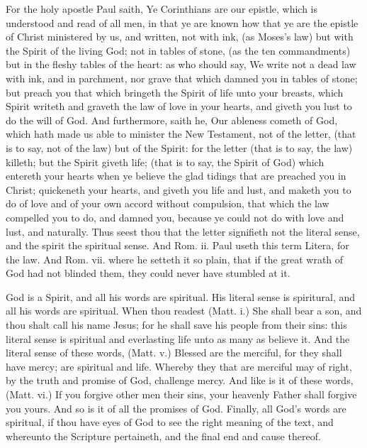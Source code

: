For the holy apostle Paul saith, Ye Corinthians are 
our epistle, which is understood and read of all men, in 
that ye are known how that ye are the epistle of Christ 
ministered by us, and written, not with ink, (as Moses's law) 
but with the Spirit of the living God; not in tables of 
stone, (as the ten commandments) but in the fleshy tables 
of the heart: as who should say, We write not a dead law 
with ink, and in parchment, nor grave that which damned 
you in tables of stone; but preach you that which bringeth 
the Spirit of life unto your breasts, which Spirit writeth 
and graveth the law of love in your hearts, and giveth you 
lust to do the will of God. And furthermore, saith he, 
Our ableness cometh of God, which hath made us able to 
minister the New Testament, not of the letter, (that is to 
say, not of the law) but of the Spirit: for the letter (that 
is to say, the law) killeth; but the Spirit giveth life; (that 
is to say, the Spirit of God) which entereth your hearts 
when ye believe the glad tidings that are preached you in 
Christ; quickeneth your hearts, and giveth you life and 
lust, and maketh you to do of love and of your own accord 
without compulsion, that which the law compelled you to 
do, and damned you, because ye could not do with love 
and lust, and naturally. Thus seest thou that the letter signifieth
not the literal sense, and the spirit the spiritual sense. 
And Rom. ii. Paul useth this term Litera, for the law. 
And Rom. vii. where he setteth it so plain, that if the 
great wrath of God had not blinded them, they could 
never have stumbled at it. 

God is a Spirit, and all his words are spiritual. His 
literal sense is spiritural, and all his words are spiritual. 
When thou readest (Matt. i.) She shall bear a son, and 
thou shalt call his name Jesus; for he shall save his 
people from their sins: this literal sense is spiritual and 
everlasting life unto as many as believe it. And the literal 
sense of these words, (Matt. v.) Blessed are the merciful, 
for they shall have mercy; are spiritual and life. Whereby 
they that are merciful may of right, by the truth and promise
of God, challenge mercy. And like is it of these 
words, (Matt. vi.) If you forgive other men their sins, your 
heavenly Father shall forgive you yours. And so is it of 
all the promises of God. Finally, all God's words are spiritual,
if thou have eyes of God to see the right meaning of 
the text, and whereunto the Scripture pertaineth, and the 
final end and cause thereof. 

